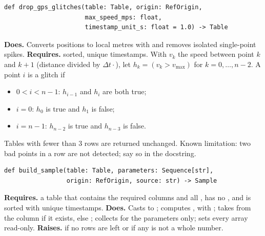 \documentclass{article}
\newenvironment{card}{\par\smallskip\noindent\begin{minipage}{\linewidth}}{\end{minipage}\par}
\begin{document}
\begin{card}
\begin{lstlisting}[style=sig]
def drop_gps_glitches(table: Table, origin: RefOrigin,
                      max_speed_mps: float,
                      timestamp_unit_s: float = 1.0) -> Table
\end{lstlisting}
\textbf{Does.} Converts positions to local metres with  and
removes isolated single-point spikes. \textbf{Requires.} sorted, unique
timestamps. With $v_k$ the speed between point $k$ and $k+1$ (distance divided
by $\Delta t\cdot$), let $h_k = (v_k > v_{\max})$ for
$k=0,\dots,n-2$. A point $i$ is a glitch if
\begin{itemize}
\item $0<i<n-1$: $h_{i-1}$ and $h_i$ are both true;
\item $i=0$: $h_0$ is true and $h_1$ is false;
\item $i=n-1$: $h_{n-2}$ is true and $h_{n-3}$ is false.
\end{itemize}
Tables with fewer than 3 rows are returned unchanged. Known limitation: two bad
points in a row are not detected; say so in the docstring.
\end{card}

\begin{card}
\begin{lstlisting}[style=sig]
def build_sample(table: Table, parameters: Sequence[str],
                 origin: RefOrigin, source: str) -> Sample
\end{lstlisting}
\textbf{Requires.} a table that contains the required columns and all
, has no , and is sorted with unique timestamps.
\textbf{Does.} Casts  to ; computes , 
with ; takes  from the  column if it
exists, else ; collects  for the parameters only; sets
every array read-only. \textbf{Raises.}  if no rows are
left or if any  is not a whole number.
\end{card}
\end{document}
